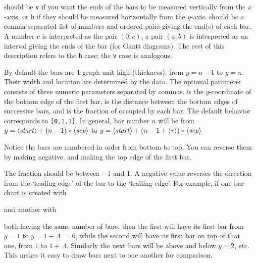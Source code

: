 \documentclass[letterpaper]{article}
\begin{document}
 should be \texttt{v} if you want the ends of the bars to
be measured vertically from the $x$-axis, or \texttt{h} if they should
be measured horizontally from the $y$-axis.  should be a
comma-separated list of numbers and ordered pairs giving the
end(s) of each bar. A number $c$ is interpreted as the pair $(0,c)$; a
pair $(a,b)$ is interpreted as an interval giving the ends of the bar
(for Gantt diagrams). The rest of this description refers to the
\texttt{h} case; the \texttt{v} case is analogous.

By default the bars are 1 graph unit high (thickness), from $y = n-1$ to
$y = n$. Their width and location are determined by the data. The
optional parameter consists of three numeric parameters separated by
commas.  is the $y$-coordinate of the bottom edge of the
first bar,  is the distance between the  bottom edges of
successive bars, and  is the fraction of  occupied by
each bar. The default behavior corresponds to \texttt{[0,1,1]}. In
general, bar number $n$ will be from $y = \langle\mbox{\rmfamily\itshape start\/}\rangle +
(n-1)*\langle\mbox{\rmfamily\itshape sep\/}\rangle$ to $y = \langle\mbox{\rmfamily\itshape start\/}\rangle + (n-1 + \langle\mbox{\rmfamily\itshape r\/}\rangle)*\langle\mbox{\rmfamily\itshape sep\/}\rangle$

Notice the bars are numbered in order from bottom to top. You can
reverse them by making  negative, and making  the
top edge of the first bar.

The fraction   should be between $-1$ and $1$. A negative value
reverses the direction from the `leading edge' of the bar to the
`trailing edge'. For example, if one bar chart is created with
\begin{ex}
  \marg{$\ldots$}
\end{ex}
and another with
\begin{ex}
  \marg{$\ldots$}
\end{ex}
both having the same number of bars, then the first will have its first
bar from $y = 1$ to $y = 1 -.4 = .6$, while the second will have its
first bar on top of that one, from $1$ to $1 + .4$. Similarly the next
bars will be above and below $y=2$, etc. This makes it easy to draw bars
next to one another for comparison.

\begin{cd}
\\
\\
\\
%
%
%
%
%
\end{cd}
\end{document}
